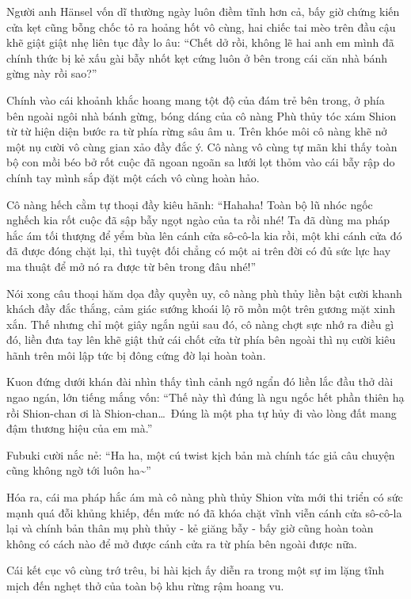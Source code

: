 \documentclass[../main.tex]{subfiles}
\begin{document}
Người anh Hänsel vốn dĩ thường ngày luôn điềm tĩnh hơn cả, bấy giờ chứng kiến cửa kẹt cũng bỗng chốc tỏ ra hoảng hốt vô cùng, hai chiếc tai mèo trên đầu cậu khẽ giật giật nhẹ liên tục đầy lo âu: ``Chết dở rồi, không lẽ hai anh em mình đã chính thức bị kẻ xấu gài bẫy nhốt kẹt cứng luôn ở bên trong cái căn nhà bánh gừng này rồi sao?''

Chính vào cái khoảnh khắc hoang mang tột độ của đám trẻ bên trong, ở phía bên ngoài ngôi nhà bánh gừng, bóng dáng của cô nàng Phù thủy tóc xám Shion từ từ hiện diện bước ra từ phía rừng sâu âm u. Trên khóe môi cô nàng khẽ nở một nụ cười vô cùng gian xảo đầy đắc ý. Cô nàng vô cùng tự mãn khi thấy toàn bộ con mồi béo bở rốt cuộc đã ngoan ngoãn sa lưới lọt thỏm vào cái bẫy rập do chính tay mình sắp đặt một cách vô cùng hoàn hảo.

Cô nàng hếch cằm tự thoại đầy kiêu hãnh: ``Hahaha! Toàn bộ lũ nhóc ngốc nghếch kia rốt cuộc đã sập bẫy ngọt ngào của ta rồi nhé! Ta đã dùng ma pháp hắc ám tối thượng để yểm bùa lên cánh cửa sô-cô-la kia rồi, một khi cánh cửa đó đã được đóng chặt lại, thì tuyệt đối chẳng có một ai trên đời có đủ sức lực hay ma thuật để mở nó ra được từ bên trong đâu nhé!''

Nói xong câu thoại hăm dọa đầy quyền uy, cô nàng phù thủy liền bật cười khanh khách đầy đắc thắng, cảm giác sướng khoái lộ rõ mồn một trên gương mặt xinh xắn. Thế nhưng chỉ một giây ngắn ngủi sau đó, cô nàng chợt sực nhớ ra điều gì đó, liền đưa tay lên khẽ giật thử cái chốt cửa từ phía bên ngoài thì nụ cười kiêu hãnh trên môi lập tức bị đông cứng đờ lại hoàn toàn.

\il

Kuon đứng dưới khán đài nhìn thấy tình cảnh ngớ ngẩn đó liền lắc đầu thở dài ngao ngán, lớn tiếng mắng vốn: ``Thế này thì đúng là ngu ngốc hết phần thiên hạ rồi Shion-chan ơi là Shion-chan\dots\ Đúng là một pha tự hủy đi vào lòng đất mang đậm thương hiệu của em mà.''

Fubuki cười nắc nẻ: ``Ha ha, một cú twist kịch bản mà chính tác giả câu chuyện cũng không ngờ tới luôn ha\~{}''

\il


Hóa ra, cái ma pháp hắc ám mà cô nàng phù thủy Shion vừa mới thi triển có sức mạnh quá đỗi khủng khiếp, đến mức nó đã khóa chặt vĩnh viễn cánh cửa sô-cô-la lại và chính bản thân mụ phù thủy - kẻ giăng bẫy - bấy giờ cũng hoàn toàn không có cách nào để mở được cánh cửa ra từ phía bên ngoài được nữa.

Cái kết cục vô cùng trớ trêu, bi hài kịch ấy diễn ra trong một sự im lặng tĩnh mịch đến nghẹt thở của toàn bộ khu rừng rậm hoang vu.
\end{document}
